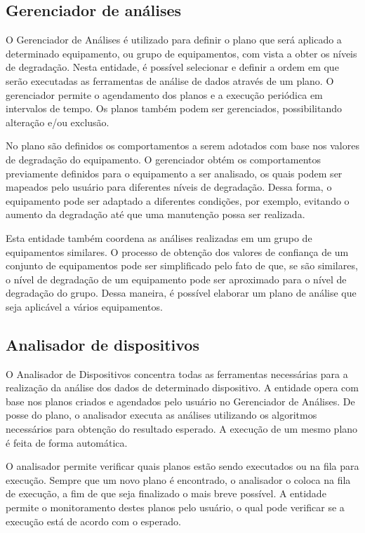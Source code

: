 \subsection{Gerenciador de análises}

O Gerenciador de Análises é utilizado para definir o plano que será aplicado a determinado
equipamento, ou grupo de equipamentos, com vista a obter os níveis de degradação.
Nesta entidade, é possível selecionar e definir a ordem em que serão executadas as ferramentas de
análise de dados através de um plano. O gerenciador permite o agendamento dos planos e a execução
periódica em intervalos de tempo. Os planos também podem ser gerenciados, possibilitando alteração
e/ou exclusão.

No plano são definidos os comportamentos a serem adotados com base nos valores de degradação do
equipamento. O gerenciador obtém os comportamentos previamente definidos para o equipamento a ser
analisado, os quais podem ser mapeados pelo usuário para diferentes níveis de degradação. Dessa
forma, o equipamento pode ser adaptado a diferentes condições, por exemplo, evitando o aumento da
degradação até que uma manutenção possa ser realizada.

Esta entidade também coordena as análises realizadas em um grupo de equipamentos similares. O
processo de obtenção dos valores de confiança de um conjunto de equipamentos pode ser simplificado
pelo fato de que, se são similares, o nível de degradação de um equipamento pode ser aproximado para
o nível de degradação do grupo. Dessa maneira, é possível elaborar um plano de análise que seja
aplicável a vários equipamentos.



\subsection{Analisador de dispositivos}

O Analisador de Dispositivos concentra todas as ferramentas necessárias para a realização da análise
dos dados de determinado dispositivo. A entidade opera com base nos planos criados e agendados pelo
usuário no Gerenciador de Análises. De posse do plano, o analisador
executa as análises utilizando os algoritmos necessários para obtenção do resultado esperado. A
execução de um mesmo plano é feita de forma automática.

O analisador permite verificar quais planos estão sendo executados ou na fila para execução. Sempre
que um novo plano é encontrado, o analisador o coloca na fila de execução, a fim de que seja
finalizado o mais breve possível. A entidade permite o monitoramento destes planos pelo usuário, o
qual pode verificar se a execução está de acordo com o esperado.


